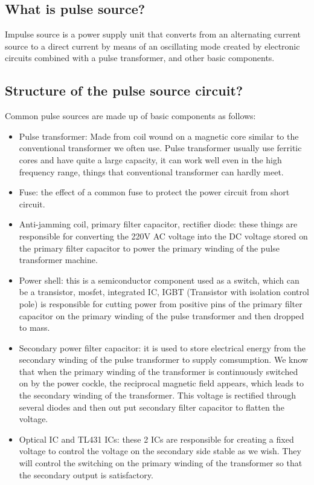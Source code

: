 \documentclass[a4paper]{report}
\begin{document}
    \subsection{What is pulse source?}
        Impulse source is a power supply unit that converts from an alternating current source to 
        a direct current by means of an oscillating mode created by electronic circuits combined with 
        a pulse transformer, and other basic components.
    \subsection{Structure of the pulse source circuit?}
        Common pulse sources are made up of basic components as follows:
        \begin{itemize}
            \item Pulse transformer: Made from coil wound on a magnetic core similar to the conventional 
            transformer we often use. Pulse transformer usually use ferritic cores and have quite a large 
            capacity, it can work well even in the high frequency range, things that conventional transformer 
            can hardly meet.
            \item Fuse: the effect of a common fuse to protect the power circuit from short circuit.
            \item Anti-jamming coil, primary filter capacitor, rectifier diode: these things are responsible 
            for converting the 220V AC voltage into the DC voltage stored on the primary filter capacitor to 
            power the primary winding of the pulse transformer machine.
            \item Power shell: this is a semiconductor component used as a switch, which can be a transistor, 
            mosfet, integrated IC, IGBT (Transistor with isolation control pole) is responsible for cutting 
            power from positive pins of the primary filter capacitor on the primary winding of the pulse transformer 
            and then dropped to mass.
            \item Secondary power filter capacitor: it is used to store electrical energy from the secondary 
            winding of the pulse transformer to supply comsumption. We know that when the primary winding of 
            the transformer is continuously switched on by the power cockle, the reciprocal magnetic field appears, 
            which leads to the secondary winding of the transformer. This voltage is rectified through several diodes 
            and then out put secondary filter capacitor to flatten the voltage.
            \item Optical IC and TL431 ICs: these 2 ICs are responsible for creating a fixed voltage to control 
            the voltage on the secondary side stable as we wish. They will control the switching on the primary 
            winding of the transformer so that the secondary output is satisfactory. 
        \end{itemize}
\end{document}
